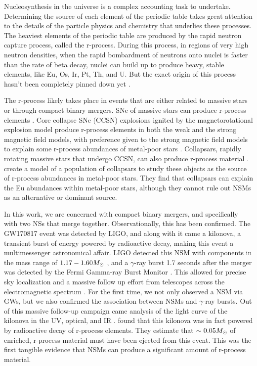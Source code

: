 \documentclass[fleqn,usenatbib]{mnras}
\begin{document}
Nucleosynthesis in the universe is a complex accounting task to undertake. Determining the source of each element of the periodic table takes great attention to the details of the particle physics and chemistry that underlies these processes. The heaviest elements of the periodic table are produced by the rapid neutron capture process, called the r-process. During this process, in regions of very high neutron densities, when the rapid bombardment of neutrons onto nuclei is faster than the rate of beta decay, nuclei can build up to produce heavy, stable elements, like Eu, Os, Ir, Pt, Th, and U. But the exact origin of this process hasn't been completely pinned down yet \citep{Kajino19, Cowan21}. 

The r-process likely takes place in events that are either related to massive stars or through compact binary mergers. SNe of massive stars can produce r-process elements \citep[see][for a discussion on different sources]{Cowan21}. Core collapse SNe (CCSN) explosions ignited by the magnetorotational explosion model produce r-process elements in both the weak and the strong magnetic field models, with preference given to the strong magnetic field models to explain some r-process abundances of metal-poor stars \citep{Nishimura15}. Collapsars, rapidly rotating massive stars that undergo CCSN, can also produce r-process material \citep{Barnes22}. \citet{Brauer21} create a model of a population of collapsars to study these objects as the source of r-process abundances in metal-poor stars. They find that collapsars can explain the Eu abundances within metal-poor stars, although they cannot rule out NSMs as an alternative or dominant source.

In this work, we are concerned with compact binary mergers, and specifically with two NSs that merge together. Observationally, this has been confirmed. The GW170817 event was detected by LIGO, and along with it came a kilonova, a transient burst of energy powered by radioactive decay, making this event a multimessenger astronomical affair. LIGO detected this NSM with components in the mass range of $1.17 - 1.60 \Ms$ \citep{Abbott17}, and a $\gamma$-ray burst 1.7 seconds after the merger was detected by the Fermi Gamma-ray Burst Monitor \citep{Goldstein17}. This allowed for precise sky localization and a massive follow up effort from telescopes across the electromagnetic spectrum \citep[see][for an extensive review of this follow-up]{Abbott17a}. For the first time, we not only observed a NSM via GWs, but we also confirmed the association between NSMs and $\gamma$-ray bursts. Out of this massive follow-up campaign came analysis of the light curve of the kilonova in the UV, optical, and IR \citep{Drout17, Pian17}. \citet{Drout17} found that this kilonova was in fact powered by radioactive decay of r-process elements. They estimate that $\sim 0.05 \Ms$ of enriched, r-process material must have been ejected from this event. This was the first tangible evidence that NSMs can produce a significant amount of r-process material.
\end{document}

